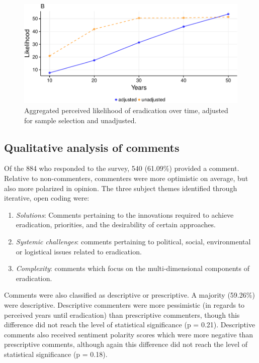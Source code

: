 \documentclass[]{article}
\begin{document}
\begin{figure}[h]

{\centering \includegraphics{paper_files/figure-latex/unnamed-chunk-11-1} 

}

\caption{Aggregated perceived likelihood of eradication over time, adjusted for sample selection and unadjusted.}\label{fig:unnamed-chunk-11}
\end{figure}

\subsection{Qualitative analysis of
comments}\label{qualitative-analysis-of-comments}

Of the 884 who responded to the survey, 540 (61.09\%) provided a
comment. Relative to non-commenters, commenters were more optimistic on
average, but also more polarized in opinion. The three subject themes
identified through iterative, open coding were:

\begin{enumerate}
\def\labelenumi{\arabic{enumi}.}
\item
  \emph{Solutions}: Comments pertaining to the innovations required to
  achieve eradication, priorities, and the desirability of certain
  approaches.
\item
  \emph{Systemic challenges}: comments pertaining to political, social,
  environmental or logistical issues related to eradication.
\item
  \emph{Complexity}: comments which focus on the multi-dimensional
  components of eradication.
\end{enumerate}

Comments were also classified as descriptive or prescriptive. A majority
(59.26\%) were descriptive. Descriptive commenters were more pessimistic
(in regards to perceived years until eradication) than prescriptive
commenters, though this difference did not reach the level of
statistical significance (p = 0.21). Descriptive comments also received
sentiment polarity scores which were more negative than prescriptive
comments, although again this difference did not reach the level of
statistical significance (p = 0.18).
\end{document}

